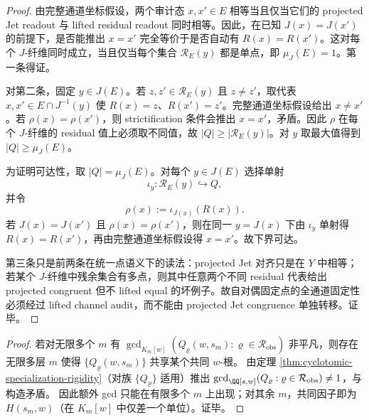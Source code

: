 \begin{proof}
由完整通道坐标假设，两个审计态 \(x,x'\in E\) 相等当且仅当它们的 projected Jet readout 与 lifted residual readout 同时相等。因此，在已知 \(J(x)=J(x')\) 的前提下，是否能推出 \(x=x'\) 完全等价于是否自动有 \(R(x)=R(x')\)。这对每个 \(J\)-纤维同时成立，当且仅当每个集合
\(\mathcal R_E(y)\) 都是单点，即 \(\mu_J(E)=1\)。第一条得证。

对第二条，固定 \(y\in J(E)\)。若 \(z,z'\in\mathcal R_E(y)\) 且 \(z\ne z'\)，取代表
\(x,x'\in E\cap J^{-1}(y)\) 使 \(R(x)=z\)、\(R(x')=z'\)。完整通道坐标假设给出 \(x\ne x'\)。若 \(\rho(x)=\rho(x')\)，则 strictification 条件会推出 \(x=x'\)，矛盾。因此 \(\rho\) 在每个 \(J\)-纤维的 residual 值上必须取不同值，故
\(|Q|\ge|\mathcal R_E(y)|\)。对 \(y\) 取最大值得到
\(|Q|\ge\mu_J(E)\)。

为证明可达性，取 \(|Q|=\mu_J(E)\)。对每个 \(y\in J(E)\) 选择单射
\[
\iota_y:\mathcal R_E(y)\hookrightarrow Q,
\]
并令
\[
\rho(x):=\iota_{J(x)}(R(x)).
\]
若 \(J(x)=J(x')\) 且 \(\rho(x)=\rho(x')\)，则在同一 \(y=J(x)\) 下由 \(\iota_y\) 单射得
\(R(x)=R(x')\)，再由完整通道坐标假设得 \(x=x'\)。故下界可达。

第三条只是前两条在统一点语义下的读法：projected Jet 对齐只是在 \(Y\) 中相等；若某个 \(J\)-纤维中残余集合有多点，则其中任意两个不同 residual 代表给出 projected congruent 但不 lifted equal 的坏例子。故自对偶固定点的全通道固定性必须经过 lifted channel audit，而不能由 projected Jet congruence 单独转移。证毕。
\end{proof}

\begin{proof}
若对无限多个 \(m\) 有
\(
\gcd_{K_m[w]}(Q_{\varrho}(w,s_m):\varrho\in\mathcal{R}_{\mathrm{obs}})
\)
非平凡，则存在无限多层 \(m\) 使得 \(\{Q_{\varrho}(w,s_m)\}\) 共享某个共同 \(w\)-根。
由定理 \ref{thm:cyclotomic-specialization-rigidity}（对族 \(\{Q_{\varrho}\}\) 适用）推出
\(
\gcd_{\QQ[s,w]}(Q_{\varrho}:\varrho\in\mathcal{R}_{\mathrm{obs}})\neq 1
\)，与构造矛盾。
因此额外 gcd 只能在有限多个 \(m\) 上出现；对其余 \(m\)，共同因子即为 \(H(s_m,w)\)（在 \(K_m[w]\) 中仅差一个单位）。证毕。
\end{proof}

